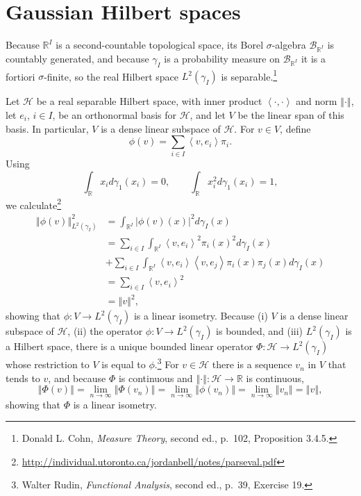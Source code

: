 \documentclass{article}
\newcommand{\inner}[2]{\left\langle #1, #2 \right\rangle}
\newcommand{\norm}[1]{\left\Vert #1 \right\Vert}
\theoremstyle{definition}
\begin{document}
\section{Gaussian Hilbert spaces}
Because $\mathbb{R}^I$ is 
a second-countable topological space, its Borel $\sigma$-algebra $\mathscr{B}_{\mathbb{R}^I}$ is countably
generated, and because $\gamma_I$ is a probability measure on $\mathscr{B}_{\mathbb{R}^I}$ it is a fortiori
$\sigma$-finite, so
the real Hilbert space $L^2(\gamma_I)$ is separable.\footnote{Donald L. Cohn,
{\em Measure Theory}, second ed., p.~102, Proposition 3.4.5.}


Let $\mathscr{H}$ be a real separable Hilbert space, with inner product $\inner{\cdot}{\cdot}$ and norm
$\norm{\cdot}$,  let $e_i$, $i \in I$, be an orthonormal basis for $\mathscr{H}$, and let $V$
be the linear span of this basis. In particular, $V$ is a dense linear subspace of $\mathscr{H}$.
For $v \in V$, define
\[
\phi(v) = \sum_{i \in I} \inner{v}{e_i} \pi_i.
\]
Using
\[
\int_{\mathbb{R}} x_i d\gamma_1(x_i) =0,\qquad
\int_{\mathbb{R}} x_i^2 d\gamma_1(x_i) = 1,
\]
we calculate\footnote{\url{http://individual.utoronto.ca/jordanbell/notes/parseval.pdf}}
\begin{align*}
\norm{\phi(v)}_{L^2(\gamma_I)}^2&=\int_{\mathbb{R}^I} |\phi(v)(x)|^2 d\gamma_I(x)\\
&= \sum_{i \in I} \int_{\mathbb{R}^I} 
\inner{v}{e_i}^2 \pi_i(x)^2d\gamma_I(x)\\
&+\sum_{i \in I} \int_{\mathbb{R}^I} \inner{v}{e_i} \inner{v}{e_j} \pi_i(x) \pi_j(x)d\gamma_I(x)\\
&=\sum_{i \in I} \inner{v}{e_i}^2\\
&=\norm{v}^2,
\end{align*}
showing that $\phi:V \to L^2(\gamma_I)$ is a linear isometry. 
Because (i) $V$ is a dense linear subspace of $\mathscr{H}$, (ii) the operator  $\phi:V \to L^2(\gamma_I)$ is bounded,
and (iii) $L^2(\gamma_I)$ is a Hilbert space, 
there is a unique bounded linear operator
$\Phi:\mathscr{H} \to L^2(\gamma_I)$ whose restriction to $V$ is equal to $\phi$.\footnote{Walter
Rudin, {\em Functional Analysis}, second ed., p.~39, Exercise 19.}
For $v \in \mathscr{H}$ there is a sequence $v_n$ in $V$ that tends to $v$, and because $\Phi$ is continuous
and $\norm{\cdot}:\mathscr{H} \to \mathbb{R}$
is continuous,
\[
\norm{\Phi (v)} = \lim_{n \to \infty} \norm{\Phi(v_n)}
=\lim_{n \to \infty} \norm{\phi(v_n)}
=\lim_{n \to \infty} \norm{v_n}
=\norm{v},
\]
showing that $\Phi$ is  a linear isometry. 
\end{document}
